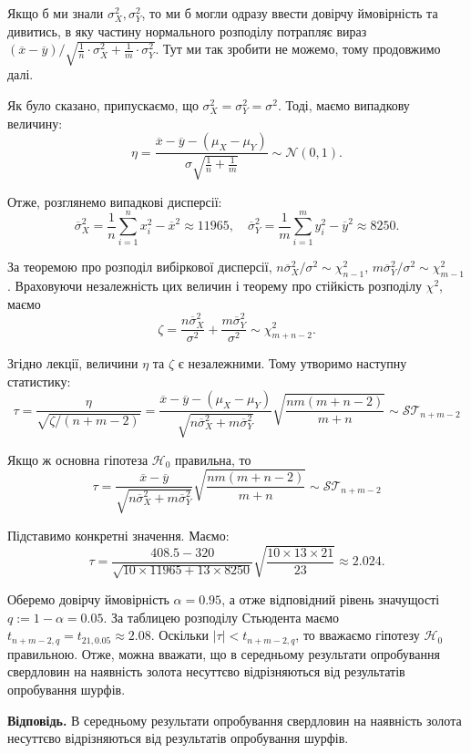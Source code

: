 \documentclass{../hw_template}
\begin{document}
Якщо б ми знали $\sigma_X^2,\sigma_Y^2$, то ми б могли одразу ввести довірчу ймовірність та дивитись, в яку частину нормального розподілу потрапляє вираз $(\overline{x} - \overline{y})\big/\sqrt{\frac{1}{n} \cdot \sigma_X^2 + \frac{1}{m} \cdot \sigma_Y^2}$. Тут ми так зробити не можемо, тому продовжимо далі.

Як було сказано, припускаємо, що $\sigma_X^2 = \sigma_Y^2 = \sigma^2$. Тоді, маємо випадкову величину:
\begin{equation*}
    \eta = \frac{\overline{x} - \overline{y} - (\mu_X - \mu_Y)}{\sigma\sqrt{\frac{1}{n} + \frac{1}{m}}} \sim \mathcal{N}(0,1).
\end{equation*}

Отже, розглянемо випадкові дисперсії:
\begin{equation*}
    \overline{\sigma}_X^2 = \frac{1}{n}\sum_{i=1}^n x_i^2 - \overline{x}^2 \approx 11965, \quad \overline{\sigma}_Y^2 = \frac{1}{m}\sum_{i=1}^m y_i^2 - \overline{y}^2 \approx 8250.
\end{equation*}

За теоремою про розподіл вибіркової дисперсії, $n\overline{\sigma}_X^2/\sigma^2 \sim \chi^2_{n-1}$, $m\overline{\sigma}_Y^2/\sigma^2 \sim \chi_{m-1}^2$. Враховуючи незалежність цих величин і теорему про стійкість розподілу $\chi^2$, маємо
\begin{equation*}
    \zeta = \frac{n\overline{\sigma}_X^2}{\sigma^2} + \frac{m\overline{\sigma}_Y^2}{\sigma^2} \sim \chi_{m+n-2}^2.
\end{equation*}

Згідно лекції, величини $\eta$ та $\zeta$ є незалежними. Тому утворимо наступну статистику:
\begin{equation*}
    \tau = \frac{\eta}{\sqrt{\zeta/(n+m-2)}} = \frac{\overline{x} - \overline{y} - (\mu_X - \mu_Y)}{\sqrt{n\overline{\sigma}_X^2+m\overline{\sigma}_Y^2}}\sqrt{\frac{nm(m+n-2)}{m+n}} \sim \mathcal{ST}_{n+m-2}
\end{equation*}

Якщо ж основна гіпотеза $\mathcal{H}_0$ правильна, то
\begin{equation*}
    \tau = \frac{\overline{x} - \overline{y}}{\sqrt{n\overline{\sigma}_X^2+m\overline{\sigma}_Y^2}}\sqrt{\frac{nm(m+n-2)}{m+n}} \sim \mathcal{ST}_{n+m-2}
\end{equation*}

Підставимо конкретні значення. Маємо:
\begin{equation*}
    \tau = \frac{408.5 - 320}{\sqrt{10 \times 11965 + 13 \times 8250}}\sqrt{\frac{10 \times 13 \times 21}{23}} \approx 2.024.
\end{equation*}

Оберемо довірчу ймовірність $\alpha=0.95$, а отже відповідний рівень значущості $q := 1-\alpha=0.05$. За таблицею розподілу Стьюдента маємо $t_{n+m-2,q}=t_{21,0.05}\approx 2.08$. Оскільки $|\tau| < t_{n+m-2,q}$, то вважаємо гіпотезу $\mathcal{H}_0$ правильною. Отже, можна вважати, що в середньому результати опробування свердловин на наявність золота несуттєво відрізняються від результатів опробування шурфів.

\textbf{Відповідь.} В середньому результати опробування свердловин на наявність золота несуттєво відрізняються від результатів опробування шурфів.
\end{document}

